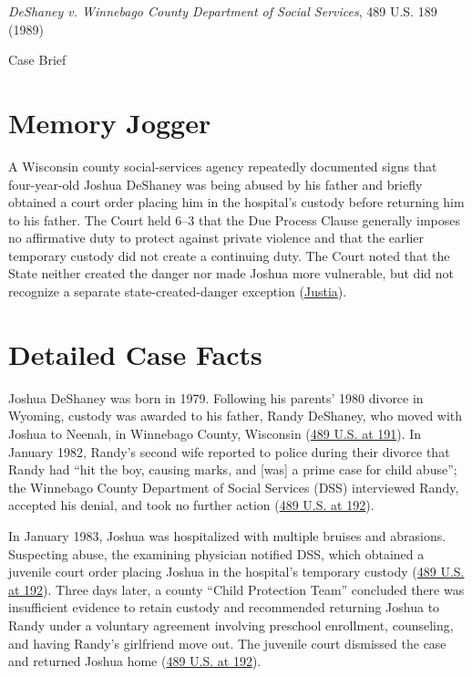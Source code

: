 \documentclass[12pt]{article}
\begin{document}
\begin{center}
{\LARGE \textit{DeShaney v. Winnebago County Department of Social Services}, 489 U.S. 189 (1989)\par}
\vspace{0.8em}
{\large Case Brief\par}
\end{center}
\vspace{1em}

\section{Memory Jogger}
A Wisconsin county social-services agency repeatedly documented signs that four-year-old Joshua DeShaney was being abused by his father and briefly obtained a court order placing him in the hospital's custody before returning him to his father. The Court held 6--3 that the Due Process Clause generally imposes no affirmative duty to protect against private violence and that the earlier temporary custody did not create a continuing duty. The Court noted that the State neither created the danger nor made Joshua more vulnerable, but did not recognize a separate state-created-danger exception (\href{https://supreme.justia.com/cases/federal/us/489/189/}{Justia}).

\section{Detailed Case Facts}
Joshua DeShaney was born in 1979. Following his parents' 1980 divorce in Wyoming, custody was awarded to his father, Randy DeShaney, who moved with Joshua to Neenah, in Winnebago County, Wisconsin (\href{https://supreme.justia.com/cases/federal/us/489/189/}{489 U.S. at 191}). In January 1982, Randy's second wife reported to police during their divorce that Randy had ``hit the boy, causing marks, and [was] a prime case for child abuse''; the Winnebago County Department of Social Services (DSS) interviewed Randy, accepted his denial, and took no further action (\href{https://supreme.justia.com/cases/federal/us/489/189/}{489 U.S. at 192}).

In January 1983, Joshua was hospitalized with multiple bruises and abrasions. Suspecting abuse, the examining physician notified DSS, which obtained a juvenile court order placing Joshua in the hospital's temporary custody (\href{https://supreme.justia.com/cases/federal/us/489/189/}{489 U.S. at 192}). Three days later, a county ``Child Protection Team'' concluded there was insufficient evidence to retain custody and recommended returning Joshua to Randy under a voluntary agreement involving preschool enrollment, counseling, and having Randy's girlfriend move out. The juvenile court dismissed the case and returned Joshua home (\href{https://supreme.justia.com/cases/federal/us/489/189/}{489 U.S. at 192}).
\end{document}

